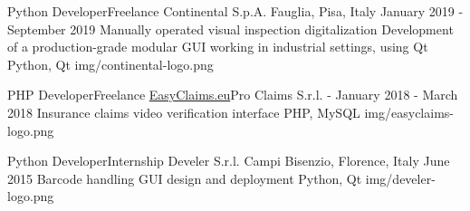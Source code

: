 \begin{cventries}
  \logocventry
    {Python Developer{\enskip\cdotp\enskip}Freelance}
    {Continental S.p.A.}
    {Fauglia, Pisa, Italy}
    {January 2019 - September 2019}
    {
      \cvexp
        {Manually operated visual inspection digitalization}
        {Development of a production-grade modular GUI working in industrial settings, using Qt}
        {Python, Qt}
    }
    {img/continental-logo.png}

  \logocventry
    {PHP Developer{\enskip\cdotp\enskip}Freelance}
    {\href{https://www.easyclaims.eu}{EasyClaims.eu}{\enskip\cdotp\enskip}Pro Claims S.r.l.}
    {-}
    {January 2018 - March 2018}
    {
      \cvexp
        {Insurance claims video verification interface}
        {}
        {PHP, MySQL}
    }
    {img/easyclaims-logo.png}

  \logocventry
    {Python Developer{\enskip\cdotp\enskip}Internship}
    {Develer S.r.l.}
    {Campi Bisenzio, Florence, Italy}
    {June 2015}
    {
      \cvexp
        {Barcode handling GUI design and deployment}
        {}
        {Python, Qt}
    }
    {img/develer-logo.png}

\end{cventries}

